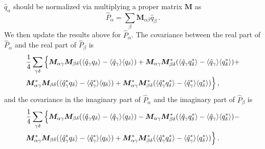 \documentclass[12pt,a4paper]{article}
\begin{document}
$\hat{q}_\alpha$ should be normalized via multiplying a proper matrix $\bm{M}$ as 
\begin{equation}
\label{eq:palpha}
    \hat{P}_\alpha = \sum_{\beta} \bm{M}_{\alpha\beta} \hat{q}_\beta \,.
\end{equation}
We then update the results above for $\hat{P}_\alpha$. The covariance between the real part of $\hat{P}_\alpha$ and the real part of $\hat{P}_\beta$ is 
\begin{align}
    &\frac{1}{4} \sum_{\gamma\delta} \Big\{ \bm{M}_{\alpha\gamma} \bm{M}_{\beta\delta} (\langle \hat{q}_\gamma q_\delta \rangle - \langle \hat{q}_\gamma \rangle\langle q_\delta\rangle) + \bm{M}_{\alpha\gamma} \bm{M}_{\beta\delta}^* (\langle \hat{q}_\gamma q_\delta^*\rangle - \langle \hat{q}_\gamma \rangle\langle q_\delta^*\rangle) + \notag\\&
        \bm{M}_{\alpha\gamma}^* \bm{M}_{\beta\delta} (\langle \hat{q}_\gamma^* q_\delta \rangle - \langle \hat{q}_\gamma^* \rangle\langle q_\delta \rangle) + 
        \bm{M}_{\alpha\gamma}^* \bm{M}_{\beta\delta}^* (\langle \hat{q}_\gamma^* q_\delta^*\rangle - \langle \hat{q}_\gamma^*\rangle\langle q_\delta^*\rangle) \Big\}\,,
\end{align}
and the covariance in the imaginary part of $\hat{P}_\alpha$ and the imaginary part of $\hat{P}_\beta$ is
\begin{align}
    &\frac{1}{4} \sum_{\gamma\delta} \Big\{ \bm{M}_{\alpha\gamma} \bm{M}_{\beta\delta} (\langle \hat{q}_\gamma q_\delta \rangle - \langle \hat{q}_\gamma \rangle\langle q_\delta\rangle) - \bm{M}_{\alpha\gamma} \bm{M}_{\beta\delta}^* (\langle \hat{q}_\gamma q_\delta^*\rangle - \langle \hat{q}_\gamma \rangle\langle q_\delta^*\rangle) - \notag\\&
        \bm{M}_{\alpha\gamma}^* \bm{M}_{\beta\delta} (\langle \hat{q}_\gamma^* q_\delta \rangle - \langle \hat{q}_\gamma^* \rangle\langle q_\delta \rangle) + 
        \bm{M}_{\alpha\gamma}^* \bm{M}_{\beta\delta}^* (\langle \hat{q}_\gamma^* q_\delta^*\rangle - \langle \hat{q}_\gamma^*\rangle\langle q_\delta^*\rangle) \Big\}\,.
\end{align}
\end{document}
